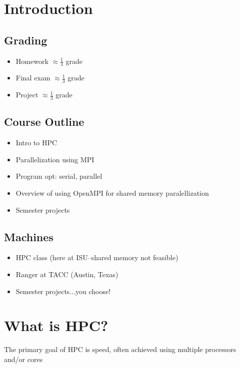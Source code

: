 \documentclass[10pt]{article}
\newenvironment{mitemize}
{
  \begin{itemize}
  \setlength{\itemsep}{1pt}
  \setlength{\parskip}{0pt}
  \setlength{\parsep}{0pt}}{\end{itemize}
}
\begin{document}
\section{Introduction}
  \subsection{Grading}
    \begin{mitemize}
      \item Homework $\approx \frac{1}{3}$ grade
      \item Final exam $\approx \frac{1}{3}$ grade
      \item Project $\approx \frac{1}{3}$ grade
    \end{mitemize}

  \subsection{Course Outline}
    \begin{mitemize}
      \item Intro to HPC
      \item Parallelization using MPI
      \item Program opt: serial, parallel
      \item Overview of using OpenMPI for shared memory paralellization
      \item Semester projects
    \end{mitemize}

  \subsection{Machines}
    \begin{mitemize}
      \item HPC class (here at ISU--shared memory not feasible)
      \item Ranger at TACC (Austin, Texas)
      \item Semester projects...you choose!
    \end{mitemize}


\section{What is HPC?}
The primary goal of HPC is speed, often achieved using multiple processors and/or cores
\end{document}
